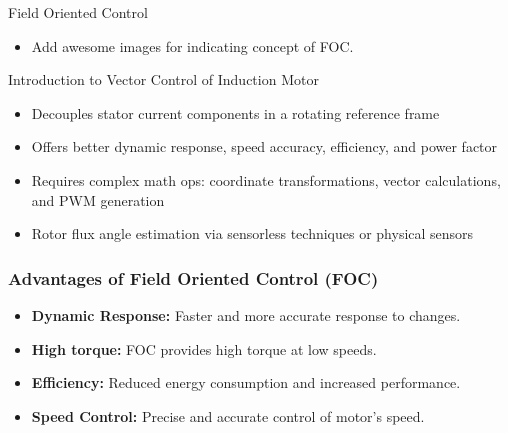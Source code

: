 


\begin{frame}{}
	\maketitle
\end{frame}

\begin{frame}{Field Oriented Control}
	\begin{itemize}
		\item Add awesome images for indicating concept of FOC.
	\end{itemize}
\end{frame}


\begin{frame}{Introduction to Vector Control of Induction Motor}
	\begin{itemize}
		\item Decouples stator current components in a rotating reference frame
		\item Offers better dynamic response, speed accuracy, efficiency, and power factor
		\item Requires complex math ops: coordinate transformations, vector calculations, and PWM generation
		\item Rotor flux angle estimation via sensorless techniques or physical sensors
	\end{itemize}
\end{frame}

\begin{frame}
	\frametitle{Advantages of Field Oriented Control (FOC)}
	\begin{itemize}
		\item \textbf{Dynamic Response:} Faster and more accurate response to changes.
		\item \textbf{High torque:} FOC provides high torque at low speeds.
		\item \textbf{Efficiency:} Reduced energy consumption and increased performance.
		\item \textbf{Speed Control:} Precise and accurate control of motor's speed.
	\end{itemize}
\end{frame}




